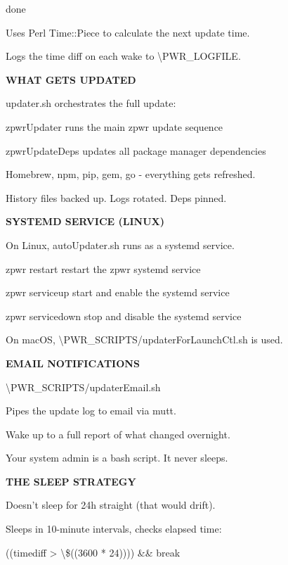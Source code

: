 \documentclass[11pt,a4paper,twoside]{book}
\begin{document}
done

Uses Perl Time::Piece to calculate the next update time.

Logs the time diff on each wake to \textbackslash{}PWR\_LOGFILE.


\vspace{12pt}
{\bfseries\color{neonyellow} WHAT GETS UPDATED}\vspace{4pt}

updater.sh orchestrates the full update:

zpwrUpdater      runs the main zpwr update sequence

zpwrUpdateDeps   updates all package manager dependencies

Homebrew, npm, pip, gem, go - everything gets refreshed.

History files backed up. Logs rotated. Deps pinned.


\vspace{12pt}
{\bfseries\color{neonyellow} SYSTEMD SERVICE (LINUX)}\vspace{4pt}

On Linux, autoUpdater.sh runs as a systemd service.

zpwr restart      restart the zpwr systemd service

zpwr serviceup    start and enable the systemd service

zpwr servicedown  stop and disable the systemd service

On macOS, \textbackslash{}PWR\_SCRIPTS/updaterForLaunchCtl.sh is used.


\vspace{12pt}
{\bfseries\color{neonyellow} EMAIL NOTIFICATIONS}\vspace{4pt}

\textbackslash{}PWR\_SCRIPTS/updaterEmail.sh

Pipes the update log to email via mutt.

Wake up to a full report of what changed overnight.

Your system admin is a bash script. It never sleeps.


\vspace{12pt}
{\bfseries\color{neonyellow} THE SLEEP STRATEGY}\vspace{4pt}

Doesn't sleep for 24h straight (that would drift).

Sleeps in 10-minute intervals, checks elapsed time:

((timediff > \textbackslash{}\$((3600 * 24)))) \&\& break
\end{document}
